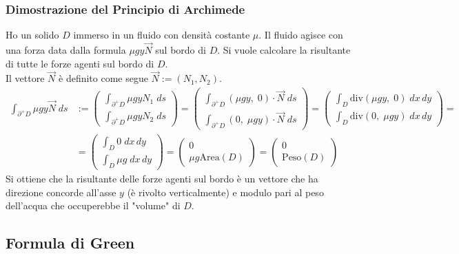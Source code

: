 \documentclass[a4paper]{article}
\newcommand\diver{\text{div}} %
\begin{document}
\subsubsection*{Dimostrazione del Principio di Archimede}
Ho un solido \(D\) immerso in un fluido con densità costante \(\mu\). Il fluido agisce con una forza data dalla formula
\(\mu g y \vec{N}\) sul bordo di \(D\). Si vuole calcolare la risultante di tutte le forze agenti sul bordo di \(D\). \\
Il vettore \(\vec{N}\) è definito come segue \(\vec{N} := (N_1, N_2)\).
\begin{align*}
	\int_{\partial^+D} \mu g y \vec{N} \; ds &:= \left(\begin{matrix}
		\displaystyle \int_{\partial^+D} \mu g y N_1 \; ds \\[10pt]
		\displaystyle \int_{\partial^+D} \mu g y N_2 \; ds
	\end{matrix}\right) = \left(\begin{matrix}
		\displaystyle \int_{\partial^+D} (\mu g y, \; 0) \cdot \vec{N} \; ds \\[10pt]
		\displaystyle \int_{\partial^+D} (0, \; \mu g y) \cdot \vec{N} \; ds
	\end{matrix}\right) = \left(\begin{matrix}
		\displaystyle \int_D \diver (\mu g y, \; 0) \; dx \, dy \\[10pt]
		\displaystyle \int_D \diver (0, \; \mu g y) \; dx \, dy
	\end{matrix}\right) = \\
	&= \left(\begin{matrix}
		\displaystyle \int_D 0 \; dx \, dy \\[10pt]
		\displaystyle \int_D \mu g \; dx \, dy
	\end{matrix}\right) = \left(\begin{matrix}
		0 \\[10pt]
		\mu g \text{Area}(D)
	\end{matrix}\right) = \left(\begin{matrix}
		0 \\[10pt]
		\text{Peso}(D)
	\end{matrix}\right)
\end{align*}
Si ottiene che la risultante delle forze agenti sul bordo è un vettore che ha direzione concorde all'asse \(y\) (è rivolto
verticalmente) e modulo pari al peso dell'acqua che occuperebbe il "volume" di \(D\).

\subsection{Formula di Green}
\end{document}
